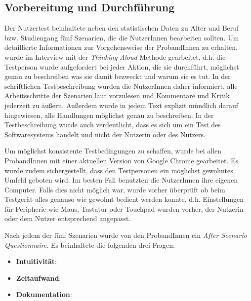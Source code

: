 \subsection{Vorbereitung und Durchführung}

Der Nutzertest beinhaltete neben den statistischen Daten zu Alter und Beruf bzw. Studiengang fünf Szenarien, die die NutzerInnen bearbeiten sollten. Um detaillierte Informationen zur Vorgehensweise der ProbandInnen zu erhalten, wurde im Interview mit der \textit{Thinking Aloud} Methode gearbeitet, d.h. die Testperson wurde aufgefordert bei jeder Aktion, die sie durchführt, möglichst genau zu beschreiben was sie damit bezweckt und warum sie es tut\cite{Nielsen1993}. In der schriftlichen Testbeschreibung wurden die NutzerInnen daher informiert, alle Arbeitsschritte der Szenarien laut vorzulesen und Kommentare und Kritik jederzeit zu äußern. Außerdem wurde in jedem Text explizit mündlich darauf hingewiesen, alle Handlungen möglichst genau zu beschreiben. In der Testbeschreibung wurde auch verdeutlicht, dass es sich um ein Test des Softwaresystems handelt und nicht der Nutzerin oder des Nutzers.

Um möglichst konsistente Testbedingungen zu schaffen, wurde bei allen ProbandInnen mit einer aktuellen Version von Google Chrome gearbeitet. Es wurde zudem sichergestellt, dass den Testpersonen ein möglichst gewohntes Umfeld geboten wird. Im besten Fall benutzten die NutzerInnen ihre eigenen Computer. Falls dies nicht möglich war, wurde vorher überprüft ob beim Testgerät alles genauso wie gewohnt bedient werden konnte, d.h. Einstellungen für Peripherie wie Maus, Tastatur oder Touchpad wurden vorher, der Nutzerin oder dem Nutzer entsprechend angepasst.

Nach jedem der fünf Szenarien wurde von den ProbandInnen ein \textit{After Scenario Questionnaire}\cite{Lewis1995}. Es beinhaltete die folgenden drei Fragen:
\begin{itemize}
	\item \textbf{Intuitivität}: 
	\item \textbf{Zeitaufwand}: 
	\item \textbf{Dokumentation}: 
\end{itemize}

